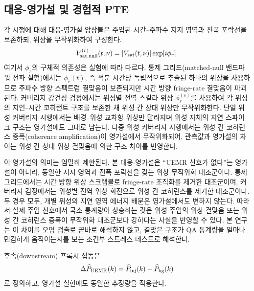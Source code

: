 \documentclass[final,5p,times]{elsarticle}
\begin{document}
\subsection{대응-영가설 및 경험적 PTE}
\label{sec:metrics:pte}

각 시행에 대해 대응-영가설 앙상블은 주입된 시간--주파수 지지 영역과 진폭 포락선을 보존하되,
위상을 무작위화하여 구성한다.
\begin{equation}
  V_{\rm sat,null}^{(r)}(t,\nu)=|V_{\rm sat}(t,\nu)|\exp[i\phi_r].
\end{equation}
여기서 $\phi_r$의 구체적 의존성은 실험에 따라 다르다. 통제 그리드(matched-null 밴드파워 전파 실험)에서는
$\phi_r(t)$, 즉 적분 시간당 독립적으로 추출된 하나의 위상을 사용하므로 주파수 방향 스펙트럼 결맞음이
보존되지만 시간 방향 fringe-rate 결맞음이 파괴된다. 커버리지 강건성 검정에서는 위성별 전역 스칼라 위상
$\phi_r^{(s)}$를 사용하여 각 위성의 지연--시간 코히런트 구조를 보존한 채 위성 간 상대 위상만 무작위화한다.
단일 위성 커버리지 시행에서는 배경--위성 교차항 위상만 달라지며 위성 자체의 지연 스파이크 구조는 영가설에도
그대로 남는다. 다중 위성 커버리지 시행에서는 위성 간 코히런스 증폭(coherence amplification)이 영가설에서
무작위화되어, 관측값과 영가설의 차이는 위성 간 상대 위상 결맞음에 의한 구조 차이를 반영한다.

이 영가설의 의미는 엄밀히 제한된다. 본 대응-영가설은 ``UEMR 신호가 없다''는 영가설이 아니라,
동일한 지지 영역과 진폭 포락선을 갖는 위상 무작위화 대조군이다. 통제 그리드에서는 시간 방향
위상 스크램블로 fringe-rate 조직화를 제거한 대조군이며, 커버리지 검정에서는 위성별 전역 위상
회전으로 위성 간 코히런스를 제거한 대조군이다. 두 경우 모두, 개별 위성의 지연 영역 에너지 배분은
영가설에서도 변하지 않는다. 따라서 실제 주입 신호에서 국소 통계량이 상승하는 것은 위성 주입의
위상 결맞음 또는 위성 간 코히런스 증폭이 무작위화 대조군보다 강하다는 사실을 반영할 수 있다.
본 연구는 이 차이를 오염 검출로 곧바로 해석하지 않고, 결맞은 구조가 QA 통계량을 얼마나 민감하게
움직이는지를 보는 조건부 스트레스 테스트로 해석한다.

후속(downstream) 프록시 섭동은
\begin{equation}
  \Delta\widehat{P}_{\rm UEMR}(k)
  =
  \widehat{P}_{\rm inj}(k)-\widehat{P}_{\rm bg}(k)
\end{equation}
로 정의하고, 영가설 실현에도 동일한 추정량을 적용한다.
\end{document}
